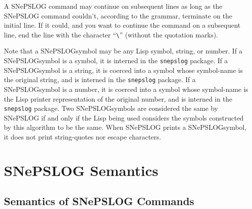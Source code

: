 \documentclass{book}
\begin{document}
A SNePSLOG command may continue on subsequent lines as long as the SNePSLOG
command couldn't, according to the grammar, terminate on the initial line.  If
it could, and you want to continue the command on a subsequent line, end the
line with the character ``\verb.\.'' (without the quotation marks).

Note that a SNePSLOGsymbol may be any Lisp symbol, string, or number.
If a SNePSLOGsymbol is a symbol, it is interned in the
\texttt{snepslog} package.  If a SNePSLOGsymbol is a string, it is
coerced into a symbol whose symbol-name is the original string, and is
interned in the \texttt{snepslog} package.  If a SNePSLOGsymbol is a
number, it is coerced into a symbol whose symbol-name is the Lisp
printer representation of the original number, and is interned in the
\texttt{snepslog} package.  Two SNePSLOGsymbols are considered the
same by SNePSLOG if and only if the Lisp being used considers the
symbols constructed by this algorithm to be the same.  When SNePSLOG
prints a SNePSLOGsymbol, it does not print string-quotes nor escape
characters.

\section{SNePSLOG Semantics}\label{sec:snepslogsem}
\subsection{Semantics of SNePSLOG Commands}\label{snepslogcommands}
 
\end{document}
